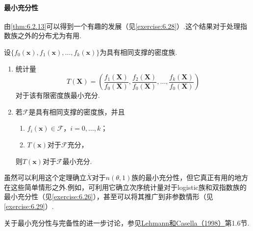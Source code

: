 \paragraph{最小充分性}
由\autoref{thm:6.2.13}可以得到一个有趣的发展（见\autoref{exercise:6.28}）.这个结果对于处理指数族之外的分布尤为有用.
\begin{theorem}[最小充分统计量]\label{thm:6.6.5}
设$\{f_0(\boldsymbol x),f_1(\boldsymbol x),\ldots,f_k(\boldsymbol x)\}$为具有相同支撑的密度族.
\begin{enumerate}[label=(\alph*)]
\item 统计量
$$T(\boldsymbol X)=\left(\frac{f_1(\boldsymbol X)}{f_0(\boldsymbol X)},\frac{f_2(\boldsymbol X)}{f_0(\boldsymbol X)},\ldots,\frac{f_k(\boldsymbol X)}{f_0(\boldsymbol X)}\right)$$
对于该有限密度族最小充分.
\item 若$\mathcal F$是具有相同支撑的密度族，并且
\begin{enumerate}[label=(\roman*)]
\item $f_i(\boldsymbol x)\in\mathcal F$，$i=0,\ldots,k$；
\item $T(\boldsymbol x)$对于$\mathcal F$充分，
\end{enumerate}
则$T(\boldsymbol x)$对于$\mathcal F$最小充分.
\end{enumerate}
\end{theorem}
虽然可以利用这个定理确立$\bar X$对于$n(\theta,1)$族的最小充分性，但它真正有用的地方在这些简单情形之外.例如，可利用它确立次序统计量对于logistic族和双指数族的最小充分性（见\autoref{exercise:6.26}），甚至可以将其推广到非参数情形（见\autoref{exercise:6.29}）.

关于最小充分性与完备性的进一步讨论，参见\hyperref[bib:source200]{Lehmann和Casella（1998）}第1.6节.
